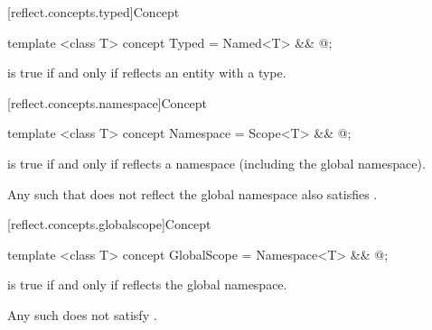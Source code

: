 [reflect.concepts.typed]{Concept }

\begin{std.txt}\color{addclr}

\begin{itemdecl}
template <class T> concept Typed = Named<T> && @\seebelow@;
\end{itemdecl}

\begin{itemdescr}
\pnum
{} is true if and only if  reflects an entity with a type.

\end{itemdescr}
\end{std.txt}

[reflect.concepts.namespace]{Concept }

\begin{std.txt}\color{addclr}

\begin{itemdecl}
template <class T> concept Namespace = Scope<T> && @\seebelow@;
\end{itemdecl}

\begin{itemdescr}
\pnum
{} is true if and only if  reflects a namespace (including the global namespace). \begin{note} Any such  that does not reflect the global namespace also satisfies . \end{note}

\end{itemdescr}
\end{std.txt}

[reflect.concepts.globalscope]{Concept }

\begin{std.txt}\color{addclr}

\begin{itemdecl}
template <class T> concept GlobalScope = Namespace<T> && @\seebelow@;
\end{itemdecl}

\begin{itemdescr}
\pnum
{} is true if and only if  reflects the global namespace. \begin{note} Any such  does not satisfy . \end{note}

\end{itemdescr}
\end{std.txt}

